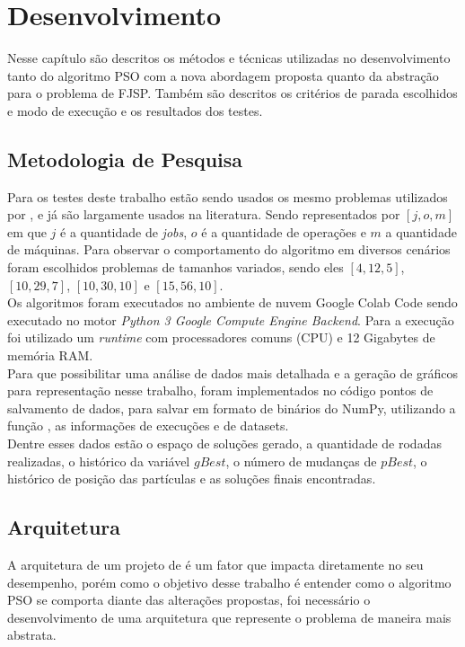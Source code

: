 \chapter{Desenvolvimento}
    Nesse capítulo são descritos os métodos e técnicas utilizadas no desenvolvimento tanto do algoritmo PSO com a nova abordagem proposta quanto da abstração para o problema de FJSP. Também são descritos os critérios de parada escolhidos e modo de execução e os resultados dos testes.


\section{Metodologia de Pesquisa}
Para os testes deste trabalho estão sendo usados os mesmo problemas utilizados por \cite{Kacem2002}, e já são largamente usados na literatura. Sendo representados por $[j, o, m]$ em que $j$ é a quantidade de \textit{jobs}, $o$ é a quantidade de operações e $m$ a quantidade de máquinas. Para observar o comportamento do algoritmo em diversos cenários foram escolhidos problemas de tamanhos variados, sendo eles $[4, 12, 5]$, $[10, 29, 7]$, $[10, 30, 10]$ e $[15, 56, 10]$.\\
%
\indent Os algoritmos foram executados no ambiente de nuvem Google Colab Code sendo executado no motor \textit{Python 3 Google Compute Engine Backend}. Para a execução foi utilizado um \textit{runtime} com processadores comuns (CPU) e 12 Gigabytes de memória RAM.\\
%
%
\indent Para que possibilitar uma análise de dados mais detalhada e a geração de gráficos para representação nesse trabalho, foram implementados no código pontos de salvamento de dados, para salvar em formato de binários do NumPy, utilizando a função , as informações de execuções e de datasets.\\
\indent Dentre esses dados estão o espaço de soluções gerado, a quantidade de rodadas realizadas, o histórico da variável $gBest$, o número de mudanças de $pBest$, o histórico de posição das partículas e as soluções finais encontradas.


\section{Arquitetura}
A arquitetura de um projeto de é um fator que impacta diretamente no seu desempenho, porém como o objetivo desse trabalho é entender como o algoritmo PSO se comporta diante das alterações propostas, foi necessário o desenvolvimento de uma arquitetura que represente o problema de maneira mais abstrata.

